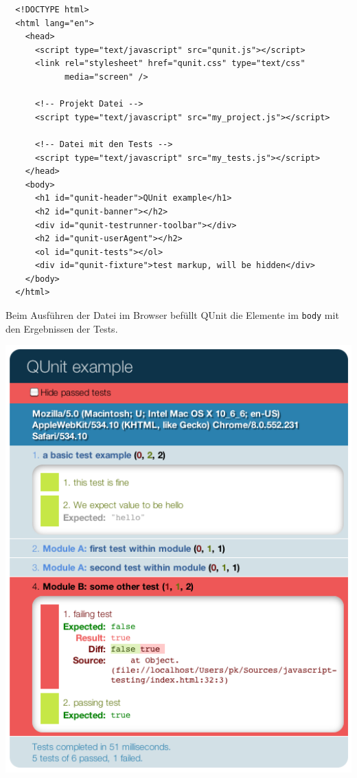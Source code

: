 \documentclass[11pt, a4paper]{article}
\begin{document}
\begin{verbatim}
  <!DOCTYPE html>
  <html lang="en">
    <head>
      <script type="text/javascript" src="qunit.js"></script>
      <link rel="stylesheet" href="qunit.css" type="text/css"
            media="screen" />

      <!-- Projekt Datei -->
      <script type="text/javascript" src="my_project.js"></script>

      <!-- Datei mit den Tests -->
      <script type="text/javascript" src="my_tests.js"></script>
    </head>
    <body>
      <h1 id="qunit-header">QUnit example</h1>
      <h2 id="qunit-banner"></h2>
      <div id="qunit-testrunner-toolbar"></div>
      <h2 id="qunit-userAgent"></h2>
      <ol id="qunit-tests"></ol>
      <div id="qunit-fixture">test markup, will be hidden</div>
    </body>
  </html>
\end{verbatim}

Beim Ausführen der Datei im Browser befüllt QUnit die Elemente im
\texttt{body} mit den Ergebnissen der Tests.

\begin{center}
  \includegraphics[width = 1\textwidth]{QUnit.png}
\end{center}
\end{document}

